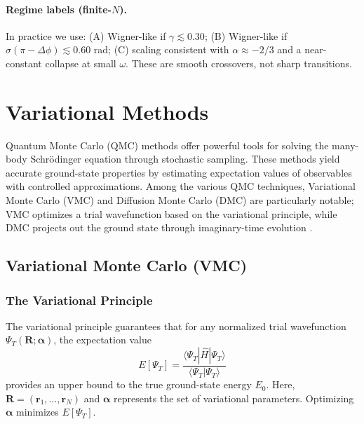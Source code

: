 \paragraph{Regime labels (finite-$N$).}
In practice we use: (A) Wigner-like if $\gamma\lesssim 0.30$; (B) Wigner-like if
$\sigma(\pi-\Delta\phi)\lesssim 0.60$ rad; (C) scaling consistent with
$\alpha\approx -2/3$ and a near-constant collapse at small $\omega$. These are
smooth crossovers, not sharp transitions.



\section{Variational Methods}

Quantum Monte Carlo (QMC) methods offer powerful tools for solving the many-body Schrödinger equation through stochastic sampling. These methods yield accurate ground-state properties by estimating expectation values of observables with controlled approximations. Among the various QMC techniques, Variational Monte Carlo (VMC) and Diffusion Monte Carlo (DMC) are particularly notable; VMC optimizes a trial wavefunction based on the variational principle, while DMC projects out the ground state through imaginary-time evolution \cite{Kroese2014-WhyMonteCarlo, KosztinFaberSchulten1996-IntroDMC}.

\subsection{Variational Monte Carlo (VMC)}
\subsubsection{The Variational Principle}
The variational principle guarantees that for any normalized trial wavefunction $\Psi_T(\mathbf{R}; \boldsymbol{\alpha})$, the expectation value
\[
E[\Psi_T] = \frac{\langle \Psi_T | \hat{H} | \Psi_T \rangle}{\langle \Psi_T | \Psi_T \rangle}
\]
provides an upper bound to the true ground-state energy $E_0$. Here, $\mathbf{R} = (\mathbf{r}_1,\dots,\mathbf{r}_N)$ and $\boldsymbol{\alpha}$ represents the set of variational parameters. Optimizing $\boldsymbol{\alpha}$ minimizes $E[\Psi_T]$.

